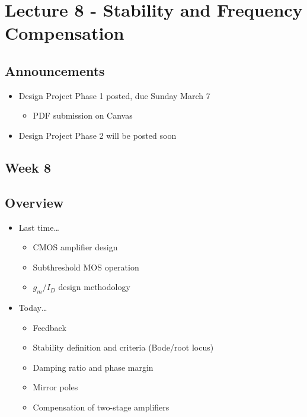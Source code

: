 \documentclass[11pt]{article}
\providecommand{\tightlist}{%
      \setlength{\itemsep}{0pt}\setlength{\parskip}{0pt}}
\begin{document}
    \hypertarget{lecture-8---stability-and-frequency-compensation}{%
\section{Lecture 8 - Stability and Frequency
Compensation}\label{lecture-8---stability-and-frequency-compensation}}

    \hypertarget{announcements}{%
\subsection{Announcements}\label{announcements}}

    \begin{itemize}
\tightlist
\item
  Design Project Phase 1 posted, due Sunday March 7

  \begin{itemize}
  \tightlist
  \item
    PDF submission on Canvas
  \end{itemize}
\item
  Design Project Phase 2 will be posted soon
\end{itemize}

    \hypertarget{week-8}{%
\subsection{Week 8}\label{week-8}}

    \hypertarget{overview}{%
\subsection{Overview}\label{overview}}

    \begin{itemize}
\tightlist
\item
  Last time\ldots{}

  \begin{itemize}
  \tightlist
  \item
    CMOS amplifier design
  \item
    Subthreshold MOS operation
  \item
    \(g_m/I_D\) design methodology
  \end{itemize}
\item
  Today\ldots{}

  \begin{itemize}
  \tightlist
  \item
    Feedback
  \item
    Stability definition and criteria (Bode/root locus)
  \item
    Damping ratio and phase margin
  \item
    Mirror poles
  \item
    Compensation of two-stage amplifiers
  \end{itemize}
\end{itemize}
\end{document}
